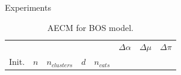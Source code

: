 \documentclass{beamer}
\begin{document}
\begin{frame}{Experiments}
\begin{table}[H]
\begin{minipage}{.48\columnwidth}
            \caption*{AECM for BOS model.}
            \label{tab:results_bos}
        \end{minipage} \hspace{.02\columnwidth}%
        \begin{minipage}{.48\columnwidth}
            \centering
            \begin{adjustbox}{width=\columnwidth}
                \begin{tabular}{lllllrrr}
                                                &                         &                       &                       &            & $\Delta \alpha$ & $\Delta \mu$ & $\Delta \pi$ \\
                    Init.                       & $n$                     & $n_{clusters}$        & $d$                   & $n_{cats}$ &                 &              &              \\


\end{tabular}
\end{adjustbox}
\end{minipage}
\end{table}
\end{frame}
\end{document}
